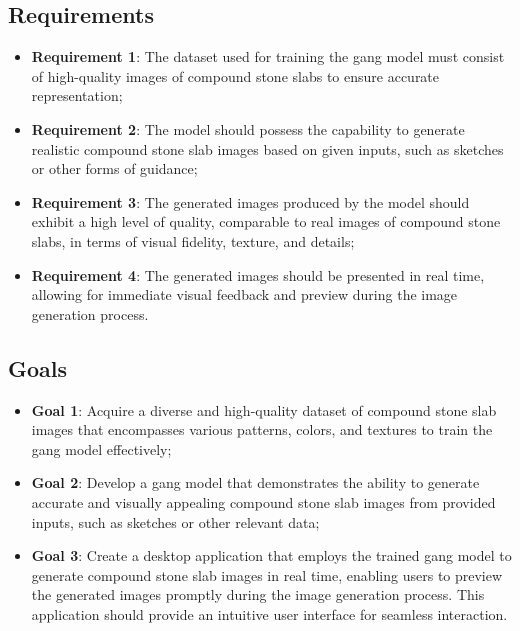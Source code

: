 \subsection{Requirements}
\begin{itemize}
    \item \textbf{Requirement 1}: The dataset used for training the \gls{gang} model must consist of high-quality images of compound stone slabs to ensure accurate representation;
    \item \textbf{Requirement 2}: The model should possess the capability to generate realistic compound stone slab images based on given inputs, such as sketches or other forms of guidance;
    \item \textbf{Requirement 3}: The generated images produced by the model should exhibit a high level of quality, comparable to real images of compound stone slabs, in terms of visual fidelity, texture, and details;
    \item \textbf{Requirement 4}: The generated images should be presented in real time, allowing for immediate visual feedback and preview during the image generation process.
\end{itemize}
\subsection{Goals}
\begin{itemize}
    \item \textbf{Goal 1}: Acquire a diverse and high-quality dataset of compound stone slab images that encompasses various patterns, colors, and textures to train the \gls{gang} model effectively;
    \item \textbf{Goal 2}: Develop a \gls{gang} model that demonstrates the ability to generate accurate and visually appealing compound stone slab images from provided inputs, such as sketches or other relevant data;
    \item \textbf{Goal 3}: Create a desktop application that employs the trained \gls{gang} model to generate compound stone slab images in real time, enabling users to preview the generated images promptly during the image generation process. 
    This application should provide an intuitive user interface for seamless interaction.
\end{itemize}
